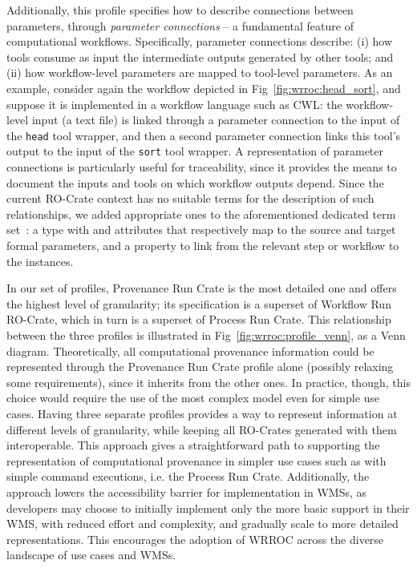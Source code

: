 Additionally, this profile specifies how to describe connections between parameters,
through \textit{parameter connections} -- a fundamental feature of computational workflows.
Specifically, parameter connections describe: (i) how tools consume as input the intermediate outputs generated by other tools; and (ii) how workflow-level parameters are mapped to tool-level parameters.
As an example, consider again the workflow depicted in Fig~\ref{fig:wrroc:head_sort},
and suppose it is implemented in a workflow language such as CWL: the workflow-level input (a text file) is linked through a parameter connection to the input of the \texttt{head} tool wrapper, and then a second parameter connection links this tool's output to the input of the \texttt{sort} tool wrapper.
%
A representation of parameter connections is particularly useful for traceability, since it provides the means to document the inputs and tools on which workflow outputs depend.
Since the current RO-Crate context has no suitable terms for the description of such relationships,
we added appropriate ones to the aforementioned dedicated term set~\cite{wrroc-terms}:
a  type with
 and  attributes that respectively map to the source and target formal parameters, and a
 property to link from the relevant step or workflow to the  instances.

In our set of profiles, Provenance Run Crate is the most detailed one and offers the highest level of granularity; its specification is a superset of Workflow Run RO-Crate, which in turn is a superset of Process Run Crate. This relationship between the three profiles is illustrated in Fig~\ref{fig:wrroc:profile_venn}, as a Venn diagram.
Theoretically, all computational provenance information could be represented through the Provenance Run Crate profile alone (possibly relaxing some requirements), since it inherits from the other ones. In practice, though, this choice would require the use of the most complex model even for simple use cases. Having three separate profiles provides a way to represent information at different levels of granularity, while keeping all RO-Crates generated with them interoperable. This approach gives a straightforward path to supporting the representation of computational provenance in simpler use cases such as with simple command executions, i.e. the Process Run Crate. Additionally, the approach lowers the accessibility barrier for implementation in WMSs, as developers may choose to initially implement only the more basic support in their WMS, with reduced effort and complexity, and gradually scale to more detailed representations. This encourages the adoption of WRROC across the diverse landscape of use cases and WMSs.

